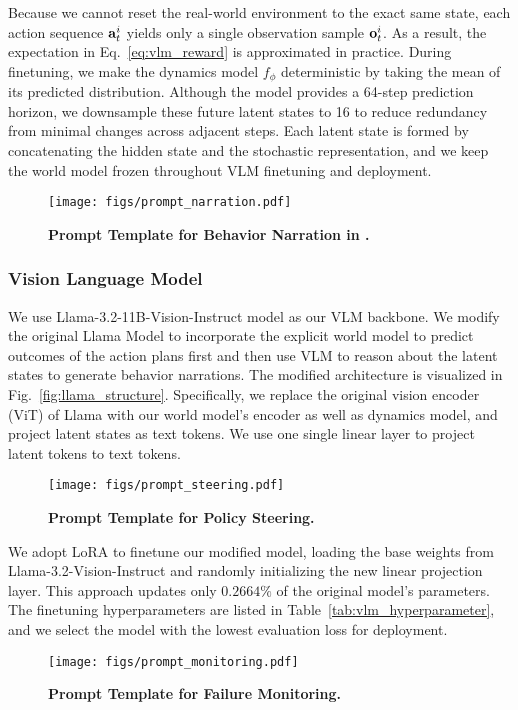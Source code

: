 Because we cannot reset the real-world environment to the exact same state, each action sequence $\mathbf{a}_t^i$
  yields only a single observation sample $\mathbf{o}^i_t$. As a result, the expectation in Eq.~\ref{eq:vlm_reward} is approximated in practice. During finetuning, we make the dynamics model $f_\phi$ deterministic by taking the mean of its predicted distribution. Although the model provides a 64-step prediction horizon, we downsample these future latent states to 16 to reduce redundancy from minimal changes across adjacent steps. Each latent state is formed by concatenating the hidden state and the stochastic representation, and we keep the world model frozen throughout VLM finetuning and deployment.
\\
\begin{figure}[h!]
    \centering
    \texttt{[image: figs/prompt\_narration.pdf]}
    \caption{\textbf{Prompt Template for Behavior Narration in \ours.}}
    \label{fig:prompt_behavior}
\end{figure}

\subsubsection{Vision Language Model}\hfill 


\label{sec:appendix_vlm}

 We use Llama-3.2-11B-Vision-Instruct model as our VLM backbone. We modify the original Llama Model to incorporate the explicit world model to predict outcomes of the action plans first and then use VLM to reason about the latent states to generate behavior narrations. The modified architecture is visualized in Fig.~\ref{fig:llama_structure}.
Specifically, we replace the original vision encoder (ViT) of Llama with our world model's encoder as well as dynamics model,  and project latent states as text tokens. We use one single linear layer to project latent tokens to text tokens.



\begin{figure}[h!]
    \centering
    \texttt{[image: figs/prompt\_steering.pdf]}
    \caption{\textbf{Prompt Template for Policy Steering.}}
    \label{fig:prompt_steering}
\end{figure}

 We adopt LoRA to finetune our modified model, loading the base weights from Llama-3.2-Vision-Instruct and randomly initializing the new linear projection layer. This approach updates only $0.2664\%$ of the original model’s parameters. The finetuning hyperparameters are listed in Table~\ref{tab:vlm_hyperparameter}, and we select the model with the lowest evaluation loss for deployment.
\begin{figure}[h!]
    \centering
    \texttt{[image: figs/prompt\_monitoring.pdf]}
    \caption{\textbf{Prompt Template for Failure Monitoring.}}
    \label{fig:prompt_monitoring}
\end{figure}

